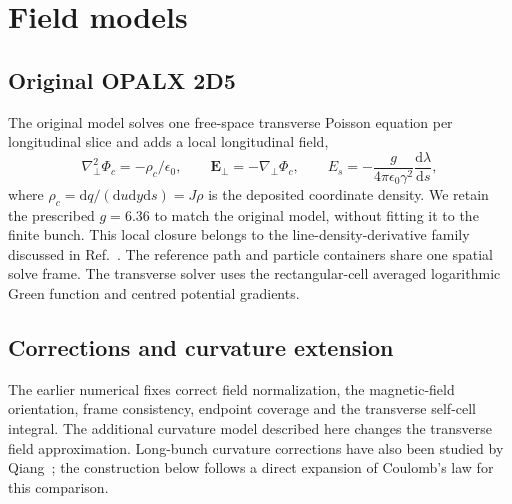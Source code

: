 \documentclass[10pt,a4paper]{article}
\newcommand{\dd}{\mathrm d}
\newcommand{\eps}{\epsilon_0}
\begin{document}
\section{Field models}
\subsection{Original OPALX 2D5}
The original model solves one free-space transverse Poisson equation per
longitudinal slice and adds a local longitudinal field,
\begin{equation}
 \nabla_\perp^2\Phi_c=-\rho_c/\eps,\qquad
 \mathbf E_\perp=-\nabla_\perp\Phi_c,\qquad
 E_s=-\frac{g}{4\pi\eps\gamma^2}\frac{\dd\lambda}{\dd s},
 \label{eq:original}
\end{equation}
where $\rho_c=\dd q/(\dd u\dd y\dd s)=J\rho$ is the deposited coordinate
density. We retain the prescribed $g=6.36$ to match the original model,
without fitting it to the finite bunch. This local closure belongs to the
line-density-derivative family discussed in Ref.~\cite{oeftiger}.
The reference path and particle containers share one spatial solve frame.
The transverse solver uses the rectangular-cell averaged logarithmic
Green function and centred potential gradients.

\subsection{Corrections and curvature extension}
The earlier numerical fixes correct field normalization, the magnetic-field
orientation, frame consistency, endpoint coverage and the transverse
self-cell integral. The additional curvature model described here changes
the transverse field approximation. Long-bunch curvature corrections have
also been studied by Qiang~\cite{qiang}; the construction below follows a
direct expansion of Coulomb's law for this comparison.
\end{document}
